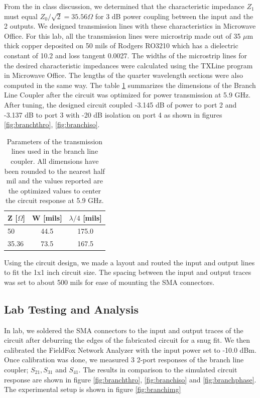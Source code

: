 \documentclass[twocolumn, aps, apl]{revtex4-1}
\begin{document}
From the in class discussion, we determined that the characteristic impedance $Z_1$ must equal $Z_0/\sqrt{2} = 35.56 \Omega$ for 3 dB power coupling between the input and the 2 outputs. We designed transmission lines with these characteristics in Microwave Office. For this lab, all the transmission lines were microstrip made out of 35 $\mu$m thick copper deposited on 50 mils of Rodgers RO3210 which has a dielectric constant of 10.2 and loss tangent 0.0027. The widths of the microstrip lines for the desired characteristic impedances were calculated using the TXLine program in Microwave Office. The lengths of the quarter wavelength sections were also computed in the same way. The table \ref{tab:branch} summarizes the dimensions of the Branch Line Coupler after the circuit was optimized for power transmission at 5.9 GHz. After tuning, the designed circuit coupled -3.145 dB of power to port 2 and -3.137 dB to port 3 with -20 dB isolation on port 4 as shown in figures \ref{fig:branchthro}, \ref{fig:branchiso}.

\begin{table}
\centering
\begin{tabular}{l | c | c}
    \hline
    Z [$\Omega$] & W [mils] & $\lambda/4$ [mils] \\
    \hline
    50  & 44.5 & 175.0 \\
    35.36 & 73.5 & 167.5 \\
    \hline
\end{tabular}
    \caption{Parameters of the transmission lines used in the branch line coupler. All dimensions have been rounded to the nearest half mil and the values reported are the optimized values to center the circuit response at 5.9 GHz. }
    \label{tab:branch}
\end{table}

Using the circuit design, we made a layout and routed the input and output lines to fit the 1x1 inch circuit size. The spacing between the input and output traces was set to about 500 mils for ease of mounting the SMA connectors. 

\subsection{Lab Testing and Analysis}
In lab, we soldered the SMA connectors to the input and output traces of the circuit after deburring the edges of the fabricated circuit for a snug fit. We then calibrated the FieldFox Network Analyzer with the input power set to -10.0 dBm. Once calibration was done, we measured 3 2-port responses of the branch line coupler; $S_{21}, S_{31}$ and $S_{41}$. The results in comparison to the simulated circuit response are shown in figure \ref{fig:branchthro}, \ref{fig:branchiso} and \ref{fig:branchphase}. The experimental setup is shown in figure \ref{fig:branchimg}
\end{document}
